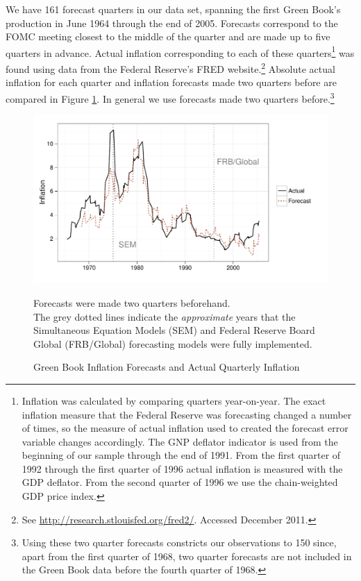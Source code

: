 \documentclass[a4paper]{article}\usepackage{graphicx, color}
\newenvironment{knitrout}{}{} %
\begin{document}
We have 161 forecast quarters in our data set, spanning the first Green Book's production in June 1964 through the end of 2005. Forecasts correspond to the FOMC meeting closest to the middle of the quarter and are made up to five quarters in advance. Actual inflation corresponding to each of these quarters\footnote{Inflation was calculated by comparing quarters year-on-year. The exact inflation measure that the Federal Reserve was forecasting changed a number of times, so the measure of actual inflation used to created the forecast error variable changes accordingly. The GNP deflator indicator is used from the beginning of our sample through the end of 1991. From the first quarter of 1992 through the first quarter of 1996 actual inflation is measured with the GDP deflator.  From the second quarter of 1996 we use the chain-weighted GDP price index. } was found using data from the Federal Reserve's FRED website.\footnote{See \url{http://research.stlouisfed.org/fred2/}. Accessed December 2011.} Absolute actual inflation for each quarter and inflation forecasts made two quarters before are compared in Figure \ref{absolute}. In general we use forecasts made two quarters before.\footnote{Using these two quarter forecasts constricts our observations to 150 since, apart from the first quarter of 1968, two quarter forecasts are not included in the Green Book data before the fourth quarter of 1968.} 


\begin{figure}[t]
    \caption{Green Book Inflation Forecasts and Actual Quarterly Inflation}
    \label{absolute}
    \begin{center}
    
\begin{knitrout}
\color{fgcolor}\includegraphics[width=0.8\linewidth]{figure/BaseInflation} 
\end{knitrout}

    
    \end{center}
    \begin{singlespace}
        {\scriptsize{Forecasts were made two quarters beforehand. \\
                     The grey dotted lines indicate the {\emph{approximate}} years that the Simultaneous Equation Models (SEM) and Federal Reserve Board Global (FRB/Global) forecasting models were fully implemented.  
                      }}
    \end{singlespace}
\end{figure}
\end{document}
